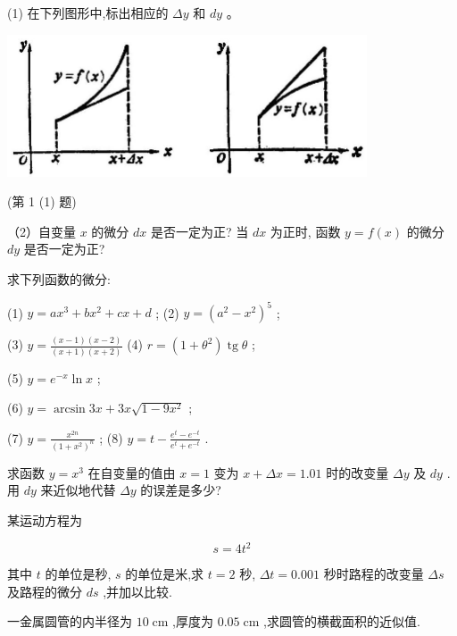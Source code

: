 \documentclass[lang=cn,newtx,12pt,scheme=chinese]{elegantbook}
\begin{document}
\begin{problemset}[习 题 八]

\item (1) 在下列图形中,标出相应的 \({\Delta y}\) 和 \({dy}\) 。

\begin{center}
\includegraphics[max width=0.8\textwidth]{images/01912c18-5c3f-733d-b775-749ba9897a9d_121_587843.jpg}
\end{center}

(第 1 (1) 题)

（2）自变量 \(x\) 的微分 \({dx}\) 是否一定为正? 当 \({dx}\) 为正时, 函数 \(y = f\left( x\right)\) 的微分 \({dy}\) 是否一定为正?

\item 求下列函数的微分:

(1) \(y = a{x}^{3} + b{x}^{2} + {cx} + d\) ; (2) \(y = {\left( {a}^{2} - {x}^{2}\right) }^{5}\) ;

(3) \(y = \frac{\left( {x - 1}\right) \left( {x - 2}\right) }{\left( {x + 1}\right) \left( {x + 2}\right) }\) (4) \(r = \left( {1 + {\theta }^{2}}\right) \operatorname{tg}\theta\) ;

(5) \(y = {e}^{-x}\ln x\) ;

(6) \(y = \arcsin {3x} + {3x}\sqrt{1 - 9{x}^{2}}\) ;

(7) \(y = \frac{{x}^{2n}}{{\left( 1 + {x}^{2}\right) }^{n}}\) ; (8) \(y = t - \frac{{e}^{t} - {e}^{-t}}{{e}^{t} + {e}^{-t}}\) .

\item 求函数 \(y = {x}^{3}\) 在自变量的值由 \(x = 1\) 变为 \(x + {\Delta x} = {1.01}\) 时的改变量 \({\Delta y}\) 及 \({dy}\) . 用 \({dy}\) 来近似地代替 \({\Delta y}\) 的误差是多少?

\item 某运动方程为

\[
s = 4{t}^{2}
\]

其中 \(t\) 的单位是秒, \(s\) 的单位是米,求 \(t = 2\) 秒, \({\Delta t} = {0.001}\) 秒时路程的改变量 \({\Delta s}\) 及路程的微分 \({ds}\) ,并加以比较.

\item 一金属圆管的内半径为 \({10}\mathrm{\;{cm}}\) ,厚度为 \({0.05}\mathrm{\;{cm}}\) ,求圆管的横截面积的近似值.


\end{problemset}
\end{document}
